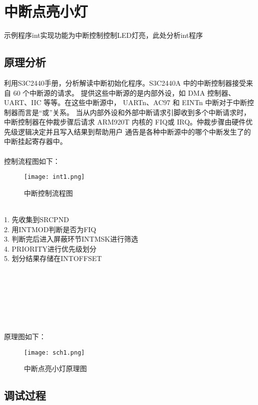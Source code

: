 \section{中断点亮小灯}
示例程序int实现功能为中断控制控制LED灯亮，此处分析int程序
\subsection{原理分析}
利用S3C2440手册，分析解读中断初始化程序。S3C2440A 中的中断控制器接受来自 60 个中断源的请求。
提供这些中断源的是内部外设，如 DMA 控制器、UART、IIC 等等。在这些中断源中，
UARTn、AC97 和 EINTn 中断对于中断控制器而言是“或”关系。
当从内部外设和外部中断请求引脚收到多个中断请求时，中断控制器在仲裁步骤后请求
 ARM920T 内核的 FIQ或 IRQ。仲裁步骤由硬件优先级逻辑决定并且写入结果到帮助用户
 通告是各种中断源中的哪个中断发生了的中断挂起寄存器中。\\
 \\
 控制流程图如下：\\
\begin{figure}[htbp]
  \centering
  \texttt{[image: int1.png]}
  \caption{中断控制流程图}
\end{figure}
\\
1. 先收集到SRCPND\\
2. 用INTMOD判断是否为FIQ\\
3. 判断完后进入屏蔽环节INTMSK进行筛选\\
4. PRIORITY进行优先级划分\\
5. 划分结果存储在INTOFFSET\\
\\
\\
\\
\\
\\
\\
\\
原理图如下：\\
\begin{figure}[htbp]
  \centering
  \texttt{[image: sch1.png]}
  \caption{中断点亮小灯原理图}
\end{figure}

\subsection{调试过程}
